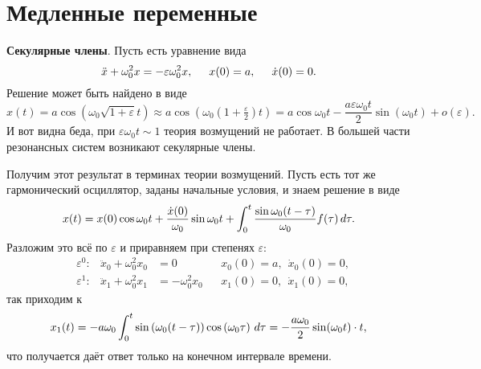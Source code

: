 \section{Медленные переменные}



\textbf{Секулярные члены}. Пусть есть уравнение вида
\begin{equation*}
    \ddot{x} + \omega_0^2 x = - \varepsilon \omega_0^2 x,\hspace{5 mm} 
    x(0) = a,
    \hspace{5 mm} \dot{x} (0) = 0.
\end{equation*}
Решение может быть найдено в виде
\begin{equation*}
    x(t) = a \cos \left(\omega_0 \sqrt{1 + \varepsilon} t\right) \approx  
    a \cos\left(\omega_0 \left(1 + \tfrac{\varepsilon}{2}\right)t\right) = a \cos \omega_0 t - \frac{a \varepsilon \omega_0 t}{2} \sin (\omega_0 t) + o(\varepsilon).
\end{equation*}
И вот видна беда, при $\varepsilon \omega_0 t \sim 1$ теория возмущений не работает. В большей части резонансных систем возникают секулярные члены. 

Получим этот результат в терминах теории возмущений. Пусть есть тот же гармонический осциллятор, заданы начальные условия, и знаем решение в виде
\begin{equation*}
    x(t) = x(0) \cos \omega_0 t + \frac{\dot{x}(0)}{\omega_0} \sin \omega_0 t + \int_{0}^{t} \frac{\sin \omega_0 (t-\tau)}{\omega_0} f(\tau) \, d \tau.
\end{equation*}
Разложим это всё по $\varepsilon$ и приравняем при степенях $\varepsilon$:
\begin{align*}
    &\varepsilon^0: 
    & \ddot{x}_0 + \omega_0^2 x_0 &= 0 
    &&x_0(0)= a, \ \ \dot{x}_0(0) = 0, \\
    &\varepsilon^1: 
    & \ddot{x}_1 + \omega_0^2 x_1 &= - \omega_0^2 x_0 
    &&x_1(0)= 0, \ \ \dot{x}_1(0) = 0,
\end{align*}
так приходим к
\begin{equation*}
    x_1 (t) = - a \omega_0 \int_{0}^{t} \sin \left(\omega_0 (t-\tau)\right) \cos \left(\omega_0 \tau\right) \, d \tau = - \frac{a \omega_0}{2} \sin (\omega_0 t) \cdot t,
\end{equation*}
что получается даёт ответ только на конечном интервале времени. 

